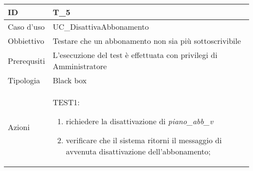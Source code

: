 \begin{table}[hb]
    \centering
    \begin{tabular}{ |p{2cm}|p{10cm}|  }
        \hline
        ID          & T\_5                                                               \\\hline
        Caso d'uso  & UC\_DisattivaAbbonamento                                           \\\hline
        Obbiettivo  & Testare che un abbonamento non sia più sottoscrivibile             \\\hline
        Prerequsiti & L'esecuzione del test è effettuata con privilegi di Amministratore \\\hline
        Tipologia   & Black box                                                          \\\hline
        Azioni      &
        TEST1:
        \begin{enumerate}[nosep, topsep=0pt]
            \item richiedere la disattivazione di \emph{piano\_abb\_v}
            \item verificare che il sistema ritorni il messaggio di avvenuta disattivazione dell'abbonamento;
        \end{enumerate}
        \\\hline
    \end{tabular}
\end{table}

